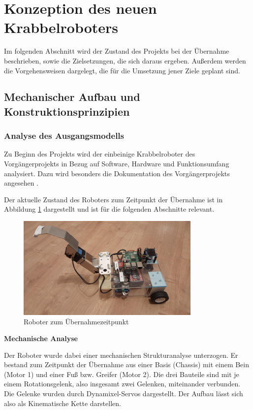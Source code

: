 \section{Konzeption des neuen Krabbelroboters}
\label{sec:konzeption}

Im folgenden Abschnitt wird der Zustand des Projekts bei der Übernahme beschrieben, sowie die Zielsetzungen, die sich daraus ergeben. Außerdem werden die Vorgehensweisen dargelegt, die für die Umsetzung jener Ziele geplant sind.

\subsection{Mechanischer Aufbau und Konstruktionsprinzipien}

\subsubsection{Analyse des Ausgangsmodells}

Zu Beginn des Projekts wird der einbeinige Krabbelroboter des Vorgängerprojekts in Bezug auf Software, Hardware und Funktionsumfang analysiert. Dazu wird besonders die Dokumentation des Vorgängerprojekts angesehen \cite{vorgängerprojekt}. 

Der aktuelle Zustand des Roboters zum Zeitpunkt der Übernahme ist in Abbildung \ref{fig:crawler_old} dargestellt und ist für die folgenden Abschnitte relevant.

\begin{figure}[h]
  \centering
  \includegraphics[width=0.8\textwidth]{crawler_old.jpeg}
  \caption{Roboter zum Übernahmezeitpunkt}
  \label{fig:crawler_old}
\end{figure}

\textbf{Mechanische Analyse}

Der Roboter wurde dabei einer mechanischen Strukturanalyse unterzogen. Er bestand zum Zeitpunkt der Übernahme aus einer Basis (Chassis) mit einem Bein (Motor 1) und einer Fuß bzw. Greifer (Motor 2). Die drei Bauteile sind mit je einem Rotationsgelenk, also insgesamt zwei Gelenken, miteinander verbunden. Die Gelenke wurden durch Dynamixel-Servos dargestellt. Der Aufbau lässt sich also als Kinematische Kette darstellen.

